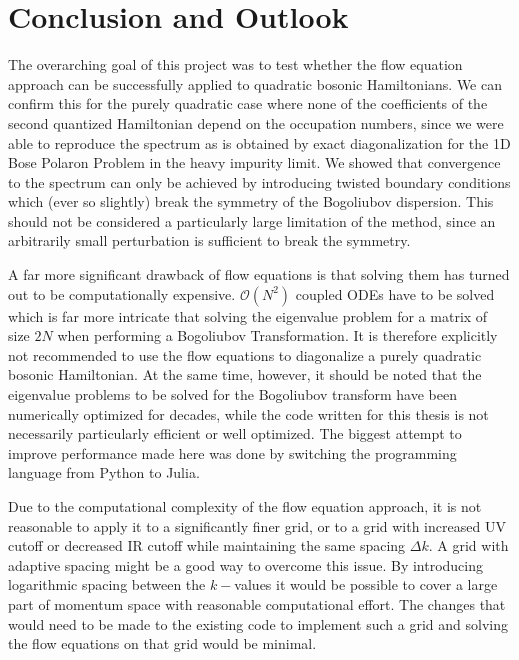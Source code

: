 \chapter{Conclusion and Outlook}\label{Conclusion and Outlook}
The overarching goal of this project was to test whether the flow equation approach can be successfully applied to quadratic bosonic Hamiltonians. We can confirm this for the purely quadratic case where none of the coefficients of the second quantized Hamiltonian depend on the occupation numbers, since we were able to reproduce the spectrum as is obtained by exact diagonalization for the 1D Bose Polaron Problem in the heavy impurity limit. We showed that convergence to the spectrum can only be achieved by introducing twisted boundary conditions which (ever so slightly) break the symmetry of the Bogoliubov dispersion. This should not be considered a particularly large limitation of the method, since an arbitrarily small perturbation is sufficient to break the symmetry. \par
A far more significant drawback of flow equations is that solving them has turned out to be computationally expensive. $\mathcal O(N^2)$ coupled ODEs have to be solved which is far more intricate that solving the eigenvalue problem for a matrix of size $2N$ when performing a Bogoliubov Transformation. It is therefore explicitly not recommended to use the flow equations to diagonalize a purely quadratic bosonic Hamiltonian. At the same time, however, it should be noted that the eigenvalue problems to be solved for the Bogoliubov transform have been numerically optimized for decades, while the code written for this thesis is not necessarily particularly efficient or well optimized. The biggest attempt to improve performance made here was done by switching the programming language from Python to Julia.\par
Due to the computational complexity of the flow equation approach, it is not reasonable to apply it to a significantly finer grid, or to a grid with increased UV cutoff or decreased IR cutoff while maintaining the same spacing $\Delta k$. A grid with adaptive spacing might be a good way to overcome this issue. By introducing logarithmic spacing between the $k-$values it would be possible to cover a large part of momentum space with reasonable computational effort. The changes that would need to be made to the existing code to implement such a grid and solving the flow equations on that grid would be minimal.   \par
